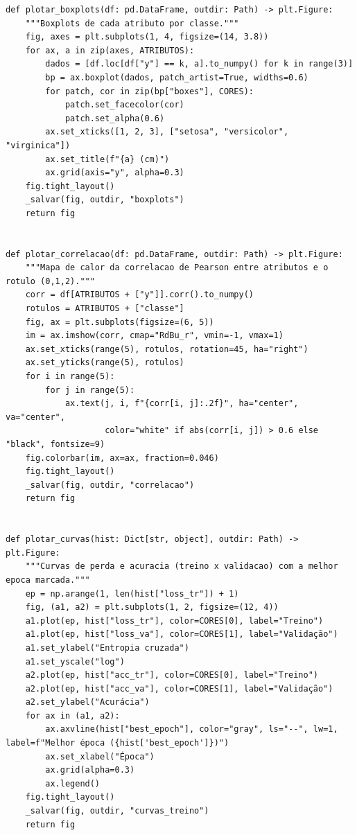 \documentclass[12pt,a4paper]{article}
\begin{document}
{\begin{lstlisting}[caption={Programa completo \texttt{iris\_mlp.py}.},label={lst:iris_mlp}]
def plotar_boxplots(df: pd.DataFrame, outdir: Path) -> plt.Figure:
    """Boxplots de cada atributo por classe."""
    fig, axes = plt.subplots(1, 4, figsize=(14, 3.8))
    for ax, a in zip(axes, ATRIBUTOS):
        dados = [df.loc[df["y"] == k, a].to_numpy() for k in range(3)]
        bp = ax.boxplot(dados, patch_artist=True, widths=0.6)
        for patch, cor in zip(bp["boxes"], CORES):
            patch.set_facecolor(cor)
            patch.set_alpha(0.6)
        ax.set_xticks([1, 2, 3], ["setosa", "versicolor", "virginica"])
        ax.set_title(f"{a} (cm)")
        ax.grid(axis="y", alpha=0.3)
    fig.tight_layout()
    _salvar(fig, outdir, "boxplots")
    return fig


def plotar_correlacao(df: pd.DataFrame, outdir: Path) -> plt.Figure:
    """Mapa de calor da correlacao de Pearson entre atributos e o rotulo (0,1,2)."""
    corr = df[ATRIBUTOS + ["y"]].corr().to_numpy()
    rotulos = ATRIBUTOS + ["classe"]
    fig, ax = plt.subplots(figsize=(6, 5))
    im = ax.imshow(corr, cmap="RdBu_r", vmin=-1, vmax=1)
    ax.set_xticks(range(5), rotulos, rotation=45, ha="right")
    ax.set_yticks(range(5), rotulos)
    for i in range(5):
        for j in range(5):
            ax.text(j, i, f"{corr[i, j]:.2f}", ha="center", va="center",
                    color="white" if abs(corr[i, j]) > 0.6 else "black", fontsize=9)
    fig.colorbar(im, ax=ax, fraction=0.046)
    fig.tight_layout()
    _salvar(fig, outdir, "correlacao")
    return fig


def plotar_curvas(hist: Dict[str, object], outdir: Path) -> plt.Figure:
    """Curvas de perda e acuracia (treino x validacao) com a melhor epoca marcada."""
    ep = np.arange(1, len(hist["loss_tr"]) + 1)
    fig, (a1, a2) = plt.subplots(1, 2, figsize=(12, 4))
    a1.plot(ep, hist["loss_tr"], color=CORES[0], label="Treino")
    a1.plot(ep, hist["loss_va"], color=CORES[1], label="Validação")
    a1.set_ylabel("Entropia cruzada")
    a1.set_yscale("log")
    a2.plot(ep, hist["acc_tr"], color=CORES[0], label="Treino")
    a2.plot(ep, hist["acc_va"], color=CORES[1], label="Validação")
    a2.set_ylabel("Acurácia")
    for ax in (a1, a2):
        ax.axvline(hist["best_epoch"], color="gray", ls="--", lw=1, label=f"Melhor época ({hist['best_epoch']})")
        ax.set_xlabel("Época")
        ax.grid(alpha=0.3)
        ax.legend()
    fig.tight_layout()
    _salvar(fig, outdir, "curvas_treino")
    return fig



\end{lstlisting}}
\end{document}
